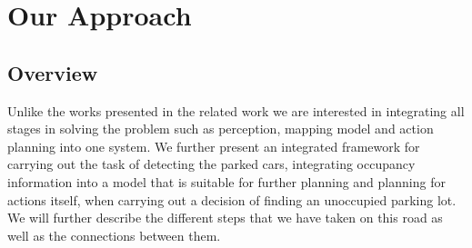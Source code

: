 
\newcommand\Bx{x}
\newcommand\Bm{m}
\def\v{\vm{v}}
\newcommand\vm[1]{\bm{\mathrm{#1}}}
\renewcommand{\v}{{\mbox{a}^i}}
\newcommand{\z}{z_{t}}
\newcommand{\y}{z_{1:t-1}}

\chapter{Our Approach}
\label{cha:our_approach}

\section{Overview} %
\label{sec:overview}
Unlike the works presented in the related work we are interested in integrating all stages in solving the problem such as perception, mapping model and action planning into one system. We further present an integrated framework for carrying out the task of detecting the parked cars, integrating occupancy information into a model that is suitable for further planning and planning for actions itself, when carrying out a decision of finding an unoccupied parking lot.
We will further describe the different steps that we have taken on this road as well as the connections between them.


